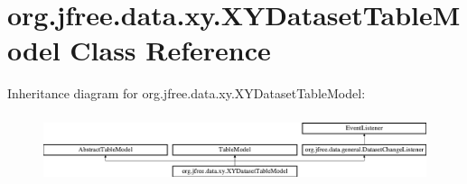 \hypertarget{classorg_1_1jfree_1_1data_1_1xy_1_1_x_y_dataset_table_model}{}\section{org.\+jfree.\+data.\+xy.\+X\+Y\+Dataset\+Table\+Model Class Reference}
\label{classorg_1_1jfree_1_1data_1_1xy_1_1_x_y_dataset_table_model}
Inheritance diagram for org.\+jfree.\+data.\+xy.\+X\+Y\+Dataset\+Table\+Model\+:\begin{figure}[H]
\begin{center}
\leavevmode
\includegraphics[height=2.007169cm]{classorg_1_1jfree_1_1data_1_1xy_1_1_x_y_dataset_table_model}
\end{center}
\end{figure}
